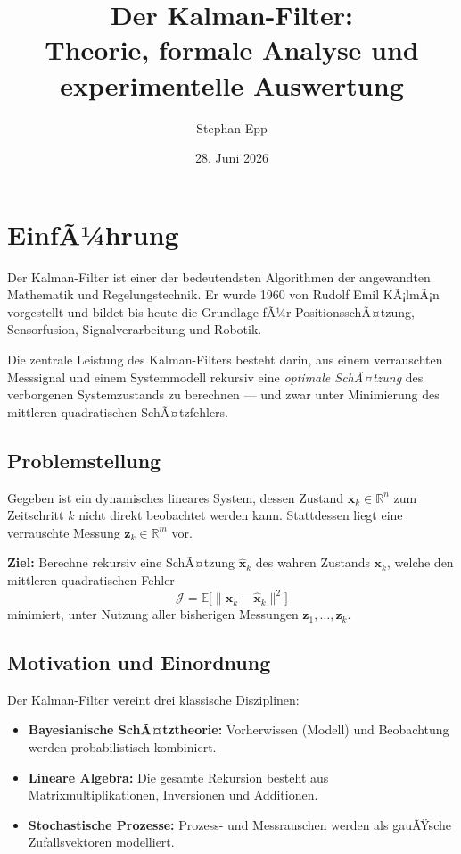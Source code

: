 ﻿\documentclass[a4paper,12pt]{article}
\title{Der Kalman-Filter:\\
\large Theorie, formale Analyse und experimentelle Auswertung}
\author{Stephan Epp}
\date{28. Juni 2026}
\theoremstyle{definition}
\begin{document}
\maketitle

\tableofcontents
\newpage

\section{EinfÃ¼hrung}

Der Kalman-Filter ist einer der bedeutendsten Algorithmen der angewandten Mathematik und Regelungstechnik.
Er wurde 1960 von Rudolf Emil KÃ¡lmÃ¡n vorgestellt \cite{kalman1960} und bildet bis heute die
Grundlage fÃ¼r PositionsschÃ¤tzung, Sensorfusion, Signalverarbeitung und Robotik.

Die zentrale Leistung des Kalman-Filters besteht darin, aus einem verrauschten Messsignal
und einem Systemmodell rekursiv eine \emph{optimale SchÃ¤tzung} des verborgenen Systemzustands zu
berechnen --- und zwar unter Minimierung des mittleren quadratischen SchÃ¤tzfehlers.

\subsection{Problemstellung}

Gegeben ist ein dynamisches lineares System, dessen Zustand $\mathbf{x}_k \in \mathbb{R}^n$ zum
Zeitschritt $k$ nicht direkt beobachtet werden kann. Stattdessen liegt eine
verrauschte Messung $\mathbf{z}_k \in \mathbb{R}^m$ vor.

\textbf{Ziel:} Berechne rekursiv eine SchÃ¤tzung $\hat{\mathbf{x}}_k$ des wahren Zustands
$\mathbf{x}_k$, welche den mittleren quadratischen Fehler
\[
    \mathcal{J} = \mathbb{E}\bigl[\|\mathbf{x}_k - \hat{\mathbf{x}}_k\|^2\bigr]
\]
minimiert, unter Nutzung aller bisherigen Messungen $\mathbf{z}_1, \ldots, \mathbf{z}_k$.

\subsection{Motivation und Einordnung}

Der Kalman-Filter vereint drei klassische Disziplinen:
\begin{itemize}
    \item \textbf{Bayesianische SchÃ¤tztheorie:} Vorherwissen (Modell) und Beobachtung
          werden probabilistisch kombiniert.
    \item \textbf{Lineare Algebra:} Die gesamte Rekursion besteht aus Matrix\-multiplikationen,
          Inversionen und Additionen.
    \item \textbf{Stochastische Prozesse:} Prozess- und Messrauschen werden als
          gauÃŸsche Zufallsvektoren modelliert.
\end{itemize}
\end{document}
